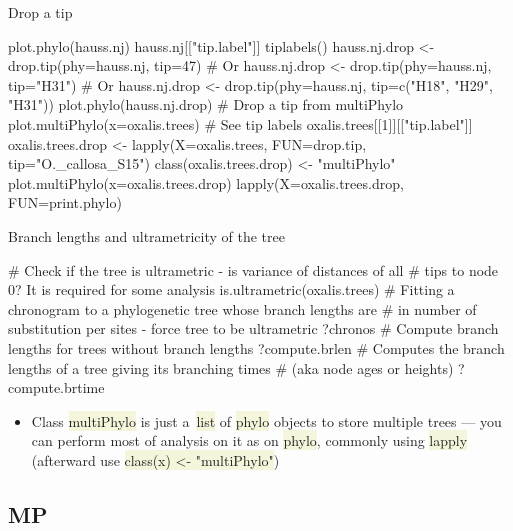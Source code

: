 \documentclass[compress, ucs, xelatex, 11pt, xcolor=svgnames, aspectratio=169,
	hyperref={
		bookmarks=true,
		unicode=true,
		colorlinks=true,
		pdftitle={Molecular data in R},
		plainpages=false,
		pdfauthor={Vojtech Zeisek},
		pdfsubject={Course about phylogeny and evolution in R},
		pdfcreator={XeLaTeX},
		pdfkeywords={R, evolution, phylogeny, molecular data},
		linkcolor=Crimson, %
		anchorcolor=Magenta, %
		citecolor=Magenta, %
		filecolor=Magenta, %
		menucolor=Magenta, %
		urlcolor=DodgerBlue, %
		pdftex},
	url={hyphens, lowtilde} %
	]{beamer}
\renewcommand{\texttt}[1]{\colorbox{Beige}{{\ttfamily #1}}}
\begin{document}
\begin{frame}[fragile]{Drop a tip}
	\begin{spluscode}
    plot.phylo(hauss.nj)
    hauss.nj[["tip.label"]]
    tiplabels()
    hauss.nj.drop <- drop.tip(phy=hauss.nj, tip=47) # Or
    hauss.nj.drop <- drop.tip(phy=hauss.nj, tip="H31") # Or
    hauss.nj.drop <- drop.tip(phy=hauss.nj, tip=c("H18", "H29", "H31"))
    plot.phylo(hauss.nj.drop)
    # Drop a tip from multiPhylo
    plot.multiPhylo(x=oxalis.trees)
    # See tip labels
    oxalis.trees[[1]][["tip.label"]]
    oxalis.trees.drop <- lapply(X=oxalis.trees, FUN=drop.tip,
      tip="O._callosa_S15")
    class(oxalis.trees.drop) <- "multiPhylo"
    plot.multiPhylo(x=oxalis.trees.drop)
    lapply(X=oxalis.trees.drop, FUN=print.phylo)
	\end{spluscode}
\end{frame}

\begin{frame}[fragile]{Branch lengths and ultrametricity of the tree}
	\begin{spluscode}
    # Check if the tree is ultrametric - is variance of distances of all
    # tips to node 0? It is required for some analysis
    is.ultrametric(oxalis.trees)
    # Fitting a chronogram to a phylogenetic tree whose branch lengths are
    # in number of substitution per sites - force tree to be ultrametric
    ?chronos
    # Compute branch lengths for trees without branch lengths
    ?compute.brlen
    # Computes the branch lengths of a tree giving its branching times
    # (aka node ages or heights)
    ?compute.brtime
	\end{spluscode}
	\begin{itemize}
		\item Class \texttt{multiPhylo} is just a~\texttt{list} of \texttt{phylo} objects to store multiple trees --- you can perform most of analysis on it as on \texttt{phylo}, commonly using \texttt{lapply} (afterward use \texttt{class(x) <- "multiPhylo"})
	\end{itemize}
\end{frame}

\subsection{MP}
\end{document}
